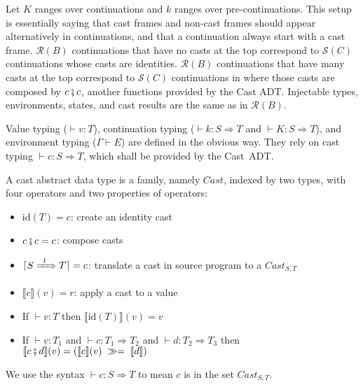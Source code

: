 \documentclass[runningheads]{llncs}
\newcommand{\RMachine}[1]{\ensuremath{\mathcal{R}(#1)}}
\newcommand{\RBMachine}[0]{\RMachine{B}}
\newcommand{\SMachine}[1]{\ensuremath{\mathcal{S}(#1)}}
\newcommand{\ccast}[3]{#1 \xRightarrow[]{\enskip #2 \enskip} #3}
\newcommand{\mbind}[0]{\ensuremath{\;\gg=\;}}
\newcommand{\denote}[1]{\ensuremath{\llbracket #1 \rrbracket}}
\newcommand{\compose}[2]{\ensuremath{#1 \fatsemi #2}}
\newcommand{\translate}[1]{\ensuremath{\lceil#1\rceil}}
\newcommand{\id}[1]{\ensuremath{\mathrm{id}(#1)}}
\newcommand{\valuetyping}[2]{\ensuremath{\vdash #1 : #2}}
\newcommand{\envtyping}[2]{\ensuremath{#1 \vdash #2}}
\newcommand{\casttyping}[3]{\ensuremath{\vdash #1 : #2 \Longrightarrow #3}}
\begin{document}
Let $K$ ranges over continuations and $k$ ranges over pre-continuations.
This setup is essentially saying that cast frames and non-cast frames should
appear alternatively in continuations, and that a continuation always start
with a cast frame.
\RMachine{B} continuations that have no casts at the top correspond
to \SMachine{C} continuations whose casts are identities.
\RMachine{B} continuations that have many casts at the top correspond
to \SMachine{C} continuations in where those casts are composed by
$\compose{c}{c}$, another functions provided by the Cast ADT.
%
Injectable types, environments, states, and cast results are the same as in \RBMachine.

Value typing (\valuetyping{v}{T}), continuation typing 
(\casttyping{k}{S}{T} and \casttyping{K}{S}{T}), and environment typing 
(\envtyping{\Gamma}{E}) are defined in the obvious way. 
They rely on cast typing \casttyping{c}{S}{T}, which shall be provided by the 
Cast~ADT.

\begin{definition}
	\label{def:cast-rep}
	A cast abstract data type is a family, namely $Cast$, indexed by two types, 
	with four operators and two properties of operators:
\begin{itemize}
	\item $\id{T}=c$: create an identity cast
	\item $\compose{c}{c}=c$: compose casts
	\item $\translate{\ccast{S}{l}{T}}=c$: translate a cast in source 
		program to a $\textit{Cast}_{S,T}$
	\item $\denote{c}(v)=r$: apply a cast to a value
	\item If $ \valuetyping{v}{T} $ then $\denote{\id{T}}(v)=v$
	\item If $ \valuetyping{v}{T_1} $ and
		$ \casttyping{c}{T_1}{T_2} $ and
		$ \casttyping{d}{T_2}{T_3} $ 
		then 
		$ \denote{\compose{c}{d}}(v) = (\denote{c}(v)\mbind\denote{d})$
\end{itemize}
We use the syntax \casttyping{c}{S}{T} to mean $c$ is in the set 
$\textit{Cast}_{S,T}$.
\end{definition}
\end{document}
